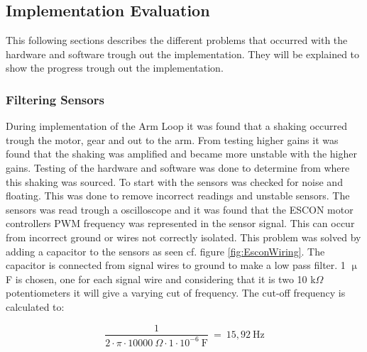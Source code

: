 \startexplain
{}
\stopexplain


\newpage


\subsection{Implementation Evaluation}
This following sections describes the different problems that occurred with the hardware and software trough out the implementation. They will be explained to show the progress trough out the implementation.
\\
\subsubsection{Filtering Sensors}
During implementation of the Arm Loop it was found that a shaking occurred trough the motor, gear and out to the arm. From testing higher gains it was found that the shaking was amplified and became more unstable with the higher gains. Testing of the hardware and software was done to determine from where this shaking was sourced. To start with the sensors was checked for noise and floating. This was done to remove incorrect readings and unstable sensors. The sensors was read trough a oscilloscope and it was found that the ESCON motor controllers PWM frequency was represented in the sensor signal. This can occur from incorrect ground or wires not correctly isolated. This problem was solved by adding a capacitor to the sensors as seen cf. figure \ref{fig:EsconWiring}. The capacitor is connected from signal wires to ground to make a low pass filter. 1 $\upmu$F is chosen, one for each signal wire and considering that it is two 10 k$\Omega$ potentiometers it will give a varying cut of frequency. The cut-off frequency is calculated to:       

\begin{equation}
\frac{1}{2\cdot \pi \cdot 10000\ \Omega \cdot 1 \cdot 10^{-6}\  \text{F}}\ =\ 15,92\ \text{Hz}
\end{equation}


